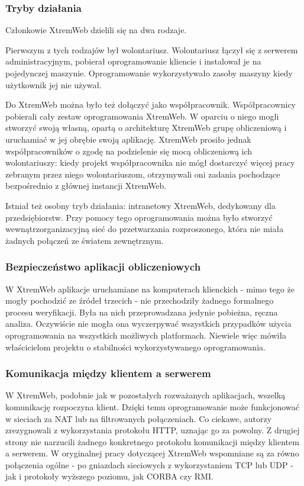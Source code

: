 \documentclass[12pt,a4paper,twoside]{article}
\begin{document}
\subsubsection{Tryby działania}

Członkowie XtremWeb dzielili się na dwa rodzaje. 

Pierwszym z tych rodzajów był wolontariusz. Wolontariusz łączył się z serwerem administracyjnym, pobierał oprogramowanie kliencie i instalował je na pojedynczej maszynie. Oprogramowanie wykorzystywało zasoby maszyny kiedy użytkownik jej nie używał.

Do XtremWeb można było też dołączyć jako współpracownik. Współpracownicy pobierali cały zestaw oprogramowania XtremWeb. W oparciu o niego mogli stworzyć swoją własną, opartą o architekturę XtremWeb grupę obliczeniową i uruchamiać w jej obrębie swoją aplikację. XtremWeb prosiło jednak współpracowników o zgodę na podzielenie się mocą obliczeniową ich wolontariuszy: kiedy projekt współpracownika nie mógł dostarczyć więcej pracy zebranym przez niego wolontariuszom, otrzymywali oni zadania pochodzące bezpośrednio z głównej instancji XtremWeb.

Istniał też osobny tryb działania: intranetowy XtremWeb, dedykowany dla przedsiębiorstw. Przy pomocy tego oprogramowania można było stworzyć wewnątrzorganizacyjną sieć do przetwarzania rozproszonego, która nie miała żadnych połączeń ze światem zewnętrznym.

\subsubsection{Bezpieczeństwo aplikacji obliczeniowych}

W XtremWeb aplikacje uruchamiane na komputerach klienckich - mimo tego że mogły pochodzić ze źródeł trzecich - nie przechodziły żadnego formalnego procesu weryfikacji. Była na nich przeprowadzana jedynie pobieżna, ręczna analiza. Oczywiście nie mogła ona wyczerpywać wszystkich przypadków użycia oprogramowania na wszystkich możliwych platformach. Niewiele więc mówiła właścicielom projektu o stabilności wykorzystywanego oprogramowania.

\subsubsection{Komunikacja między klientem a serwerem}

W XtremWeb, podobnie jak w pozostałych rozważanych aplikacjach, wszelką komunikację rozpoczyna klient. Dzięki temu oprogramowanie może funkcjonować w sieciach za NAT lub na filtrowanych połączeniach. Co ciekawe, autorzy zrezygnowali z wykorzystania protokołu HTTP, uznając go za powolny. Z drugiej strony nie narzucili żadnego konkretnego protokołu komunikacji między klientem a serwerem. W oryginalnej pracy dotyczącej XtremWeb wspomniane są za równo połączenia ogólne - po gniazdach sieciowych z wykorzystaniem TCP lub UDP - jak i protokoły wyższego poziomu, jak CORBA czy RMI.
\end{document}
